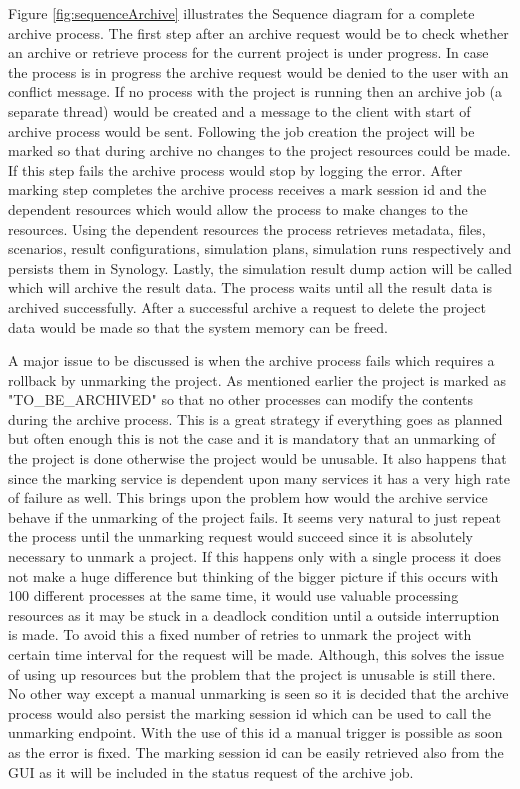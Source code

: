 Figure \ref{fig:sequenceArchive} illustrates the Sequence diagram for a complete archive process. The first step after an archive request would be to check
whether an archive or retrieve process for the current project is under progress. In case the process is in progress the archive request would be denied to the
user with an conflict message. If no process with the project is running then an archive job (a separate thread) would be created and a message to the client with start of archive process would be
sent. Following the job creation the project will be marked so that during archive no changes to the project resources could be made. If this step fails the archive 
process would stop by logging the error. After marking step completes the archive process receives a mark session id and the dependent resources which would allow the process to make
changes to the resources. Using the dependent resources the process retrieves metadata, files, scenarios, result configurations, simulation plans, simulation runs 
respectively and persists them in Synology. Lastly, the simulation result dump action will be called which will archive the result data. The process waits until
all the result data is archived successfully. After a successful archive a request to delete the project data would be made so that the system memory can be freed.

A major issue to be discussed is when the archive process fails which requires a rollback by unmarking the project. As mentioned earlier the project is
marked as "TO\_BE\_ARCHIVED" so that no other processes can modify the contents during the archive process. This is a great strategy if everything goes as planned but 
often enough this is not the case and it is mandatory that an unmarking of the project is done otherwise the project would be unusable. It also happens that since the
marking service is dependent upon many services it has a very high rate of failure as well. This brings upon the problem how would the archive service behave if the
unmarking of the project fails. It seems very natural to just repeat the process until the unmarking request would succeed since it is absolutely necessary to unmark
a project. If this happens only with a single process it does not make a huge difference but thinking of the bigger picture if this 
occurs with 100 different processes at the same time, it would use valuable processing resources as it may be stuck in a deadlock condition until a outside interruption
is made. To avoid this a fixed number of retries to unmark the project with certain time interval for the request 
will be made. Although, this solves the issue of using up resources but the problem that the project is unusable is still there. No other way except a manual unmarking is seen so 
it is decided that the archive process would also persist the marking session id which can be used to call the unmarking endpoint. With the use of this id a manual 
trigger is possible as soon as the error is fixed. The marking session id can be easily retrieved also from the GUI as it will be included in the status request of
the archive job.
 